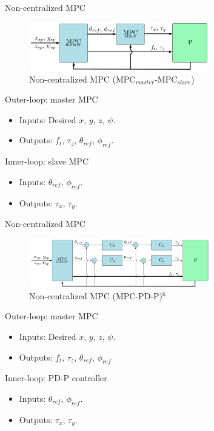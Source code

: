 \documentclass{thesisbeamer}
\newcommand\Fontvi{\fontsize{9}{10}\selectfont}
\begin{document}
\begin{frame}{Non-centralized MPC}
	\Fontvi

			\begin{figure}
				\includegraphics[width=0.7\textwidth]{Images/Control/non-centralized_mpc_1.png}
				\caption{Non-centralized MPC (MPC$_{master}$-MPC$_{slave}$)\protect\footnotemark}
			\end{figure}

			Outer-loop: master MPC
			\begin{itemize}
				\item Inputs: Desired $x$, $y$, $z$, $\psi$.
				\item Outputs: $f_t$, $\tau_z$, $\theta_{ref}$, $\phi_{ref}$.
			\end{itemize}
			Inner-loop: slave MPC
			\begin{itemize}
				\item Inputs: $\theta_{ref}$, $\phi_{ref}$. 
				\item Outputs: $\tau_x$, $\tau_y$.
			\end{itemize}
\end{frame}

\begin{frame}{Non-centralized MPC}
	\Fontvi
	
			\begin{figure}
				\includegraphics[width=0.7\textwidth]{Images/Control/non-centralized_mpc_2.png}
				\caption{Non-centralized MPC (MPC-PD-P)$^6$}
			\end{figure}
			Outer-loop: master MPC
			\begin{itemize}
				\item Inputs: Desired $x$, $y$, $z$, $\psi$.
				\item Outputs: $f_t$, $\tau_z$, $\theta_{ref}$, $\phi_{ref}$ 
			\end{itemize}
			Inner-loop: PD-P controller
			\begin{itemize}
				\item Inputs: $\theta_{ref}$, $\phi_{ref}$. 
				\item Outputs: $\tau_x$, $\tau_y$.
			\end{itemize}
			
\end{frame}
\end{document}
